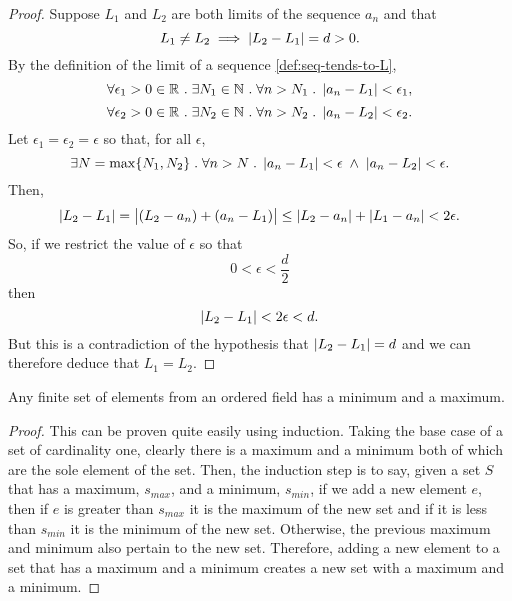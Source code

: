 \documentclass[../MathsNotesBase.tex]{subfiles}
\begin{document}
{			
		\bigskip	
		\begin{proof}
			Suppose $L_1$ and $L_2$ are both limits of the sequence $a_n$ and that
			\[  L_1 \neq L_2 \implies \left\lvert L_2 - L_1\right\rvert = d > 0. \]
			By the definition of the limit of a sequence \ref{def:seq-tends-to-L},
			\[ \forall \epsilon_1 > 0 \in \mathbb{R}^{} \;.\; \exists N_1 \in \mathbb{N}^{} \;.\; \forall n > N_1 \;.\; \left\lvert a_n - L_1\right\rvert < \epsilon_1, \]
			\[ \forall \epsilon_2 > 0 \in \mathbb{R}^{} \;.\; \exists N_2 \in \mathbb{N}^{} \;.\; \forall n > N_2 \;.\; \left\lvert a_n - L_2\right\rvert < \epsilon_2. \]
			Let ${ \epsilon_1 = \epsilon_2 = \epsilon }$ so that, for all $\epsilon$,
			\[ \exists N = \max \{ N_1, N_2 \} \;.\; \forall n > N \;.\; \left\lvert a_n - L_1\right\rvert < \epsilon \; \land \; \left\lvert a_n - L_2\right\rvert < \epsilon. \]
			Then,
			\[ \left\lvert L_2 - L_1\right\rvert = \left\lvert(L_2 - a_n) + (a_n - L_1)\right\rvert \leq \left\lvert L_2 - a_n\right\rvert + \left\lvert L_1 - a_n\right\rvert < 2\epsilon. \]	
			So, if we restrict the value of $\epsilon$ so that
			\[ 0 < \epsilon < \frac{d}{2} \]
			then
			\[ \left\lvert L_2 - L_1\right\rvert < 2\epsilon < d. \]
			But this is a contradiction of the hypothesis that ${ \left\lvert L_2 - L_1\right\rvert = d }$ and we can therefore deduce that ${ L_1 = L_2 }$.
		\end{proof}	
		
		\bigskip
		\begin{lemma}
			Any finite set of elements from an ordered field has a minimum and a maximum.
		\end{lemma}
		\begin{proof}
			This can be proven quite easily using induction. Taking the base case of a set of cardinality one, clearly there is a maximum and a minimum both of which are the sole element of the set. Then, the induction step is to say, given a set $S$ that has a maximum, $s_{max}$, and a minimum, $s_{min}$, if we add a new element $e$, then if $e$ is greater than $s_{max}$ it is the maximum of the new set and if it is less than $s_{min}$ it is the minimum of the new set. Otherwise, the previous maximum and minimum also pertain to the new set. Therefore, adding a new element to a set that has a maximum and a minimum creates a new set with a maximum and a minimum.
		\end{proof}
	
}
\end{document}
